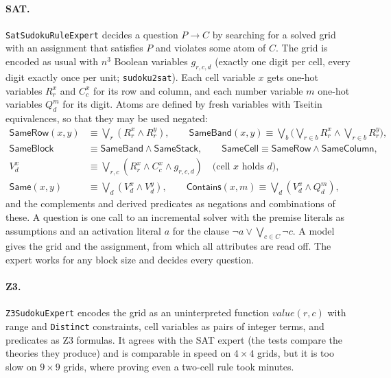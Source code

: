 \documentclass[11pt,a4paper]{article}
\theoremstyle{definition}
\theoremstyle{remark}
\newcommand{\code}[1]{\texttt{#1}}
\newcommand{\pred}[1]{\mathsf{#1}}
\begin{document}
\paragraph{SAT.}
\code{SatSudokuRuleExpert} decides a question $P \to C$ by searching for a solved grid with an assignment that satisfies $P$ and violates some atom of $C$. The grid is encoded as usual with $n^3$ Boolean variables $g_{r,c,d}$ (exactly one digit per cell, every digit exactly once per unit; \code{sudoku2sat}). Each cell variable $x$ gets one-hot variables $R^x_r$ and $C^x_c$ for its row and column, and each number variable $m$ one-hot variables $Q^m_d$ for its digit. Atoms are defined by fresh variables with Tseitin equivalences, so that they may be used negated:
\begin{align*}
  \pred{SameRow}(x, y) &\equiv \textstyle\bigvee_r (R^x_r \wedge R^y_r), \qquad
  \pred{SameBand}(x, y) \equiv \bigvee_b \bigl(\bigvee_{r \in b} R^x_r \wedge \bigvee_{r \in b} R^y_r\bigr),\\
  \pred{SameBlock} &\equiv \pred{SameBand} \wedge \pred{SameStack}, \qquad
  \pred{SameCell} \equiv \pred{SameRow} \wedge \pred{SameColumn},\\
  V^x_d &\equiv \textstyle\bigvee_{r,c} (R^x_r \wedge C^x_c \wedge g_{r,c,d}) \quad\text{(cell $x$ holds $d$)},\\
  \pred{Same}(x, y) &\equiv \textstyle\bigvee_d (V^x_d \wedge V^y_d), \qquad
  \pred{Contains}(x, m) \equiv \bigvee_d (V^x_d \wedge Q^m_d),
\end{align*}
and the complements and derived predicates as negations and combinations of these. A question is one call to an incremental solver with the premise literals as assumptions and an activation literal $a$ for the clause $\neg a \vee \bigvee_{c \in C} \neg c$. A model gives the grid and the assignment, from which all attributes are read off. The expert works for any block size and decides every question.

\paragraph{Z3.}
\code{Z3SudokuExpert} encodes the grid as an uninterpreted function $\mathit{value}(r, c)$ with range and \code{Distinct} constraints, cell variables as pairs of integer terms, and predicates as Z3 formulas. It agrees with the SAT expert (the tests compare the theories they produce) and is comparable in speed on $4 \times 4$ grids, but it is too slow on $9 \times 9$ grids, where proving even a two-cell rule took minutes.
\end{document}
